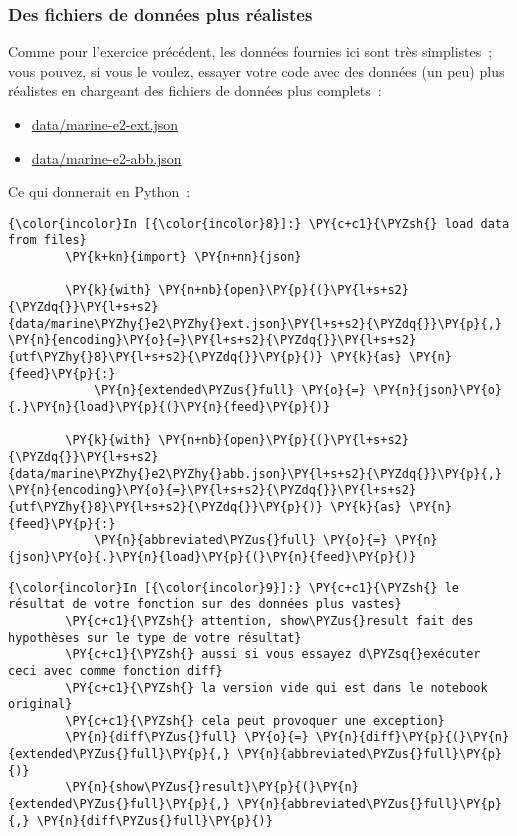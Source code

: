     \hypertarget{des-fichiers-de-donnuxe9es-plus-ruxe9alistes}{%
\subsubsection{Des fichiers de données plus
réalistes}\label{des-fichiers-de-donnuxe9es-plus-ruxe9alistes}}

    Comme pour l'exercice précédent, les données fournies ici sont très
simplistes~; vous pouvez, si vous le voulez, essayer votre code avec des
données (un peu) plus réalistes en chargeant des fichiers de données
plus complets~:

\begin{itemize}
\tightlist
\item
  \url{data/marine-e2-ext.json}
\item
  \url{data/marine-e2-abb.json}
\end{itemize}

Ce qui donnerait en Python~:

    \begin{Verbatim}[commandchars=\\\{\}]
{\color{incolor}In [{\color{incolor}8}]:} \PY{c+c1}{\PYZsh{} load data from files}
        \PY{k+kn}{import} \PY{n+nn}{json}
        
        \PY{k}{with} \PY{n+nb}{open}\PY{p}{(}\PY{l+s+s2}{\PYZdq{}}\PY{l+s+s2}{data/marine\PYZhy{}e2\PYZhy{}ext.json}\PY{l+s+s2}{\PYZdq{}}\PY{p}{,} \PY{n}{encoding}\PY{o}{=}\PY{l+s+s2}{\PYZdq{}}\PY{l+s+s2}{utf\PYZhy{}8}\PY{l+s+s2}{\PYZdq{}}\PY{p}{)} \PY{k}{as} \PY{n}{feed}\PY{p}{:}
            \PY{n}{extended\PYZus{}full} \PY{o}{=} \PY{n}{json}\PY{o}{.}\PY{n}{load}\PY{p}{(}\PY{n}{feed}\PY{p}{)}
        
        \PY{k}{with} \PY{n+nb}{open}\PY{p}{(}\PY{l+s+s2}{\PYZdq{}}\PY{l+s+s2}{data/marine\PYZhy{}e2\PYZhy{}abb.json}\PY{l+s+s2}{\PYZdq{}}\PY{p}{,} \PY{n}{encoding}\PY{o}{=}\PY{l+s+s2}{\PYZdq{}}\PY{l+s+s2}{utf\PYZhy{}8}\PY{l+s+s2}{\PYZdq{}}\PY{p}{)} \PY{k}{as} \PY{n}{feed}\PY{p}{:}
            \PY{n}{abbreviated\PYZus{}full} \PY{o}{=} \PY{n}{json}\PY{o}{.}\PY{n}{load}\PY{p}{(}\PY{n}{feed}\PY{p}{)}
\end{Verbatim}


    \begin{Verbatim}[commandchars=\\\{\}]
{\color{incolor}In [{\color{incolor}9}]:} \PY{c+c1}{\PYZsh{} le résultat de votre fonction sur des données plus vastes}
        \PY{c+c1}{\PYZsh{} attention, show\PYZus{}result fait des hypothèses sur le type de votre résultat}
        \PY{c+c1}{\PYZsh{} aussi si vous essayez d\PYZsq{}exécuter ceci avec comme fonction diff}
        \PY{c+c1}{\PYZsh{} la version vide qui est dans le notebook original}
        \PY{c+c1}{\PYZsh{} cela peut provoquer une exception}
        \PY{n}{diff\PYZus{}full} \PY{o}{=} \PY{n}{diff}\PY{p}{(}\PY{n}{extended\PYZus{}full}\PY{p}{,} \PY{n}{abbreviated\PYZus{}full}\PY{p}{)}
        \PY{n}{show\PYZus{}result}\PY{p}{(}\PY{n}{extended\PYZus{}full}\PY{p}{,} \PY{n}{abbreviated\PYZus{}full}\PY{p}{,} \PY{n}{diff\PYZus{}full}\PY{p}{)}
\end{Verbatim}


